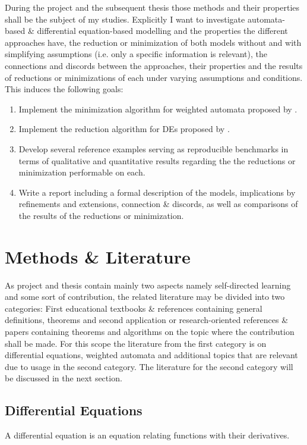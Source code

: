 \documentclass[11pt, rgb]{scrartcl}
\begin{document}
During the project and the subsequent thesis those methods and their properties shall be the subject of my studies.
Explicitly I want to investigate automata-based \& differential equation-based modelling and the properties the different approaches have, the reduction or minimization of both models without and with simplifying assumptions (i.e. only a specific information is relevant), the connections and discords between the approaches, their properties and the results of reductions or minimizations of each under varying assumptions and conditions. \\

This induces the following goals:
\begin{enumerate}
 \item Implement the minimization algorithm for weighted automata proposed by \autocite{Kiefer2013OnTC}.
 \item Implement the reduction algorithm for DEs proposed by \autocite{Cardelli2017MaximalAO}.
 \item Develop several reference examples serving as reproducible benchmarks in terms of qualitative and quantitative results regarding the the reductions or minimization performable on each.
 \item Write a report including a formal description of the models, implications by refinements and extensions, connection \& discords, as well as comparisons of the results of the reductions or minimization.
\end{enumerate}



\section{Methods \& Literature}
As project and thesis contain mainly two aspects namely self-directed learning and some sort of contribution, the related literature may be divided into two categories: First educational textbooks \& references containing general definitions, theorems and second application or research-oriented references \& papers containing theorems and algorithms on the topic where the contribution shall be made. 
For this scope the literature from the first category is on differential equations, weighted automata and additional topics that are relevant due to usage in the second category. 
The literature for the second category will be discussed in the next section. 

\subsection{Differential Equations} 
A differential equation is an equation relating functions with their derivatives.
\end{document}
